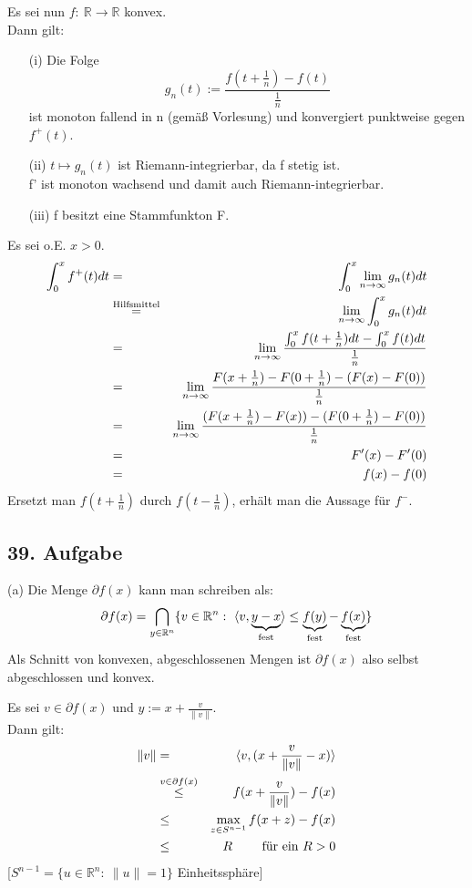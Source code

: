 \documentclass[a4paper,11pt,twoside,titlepage]{article}
\newcommand{\R}{{\mathbb R}}
\begin{document}
Es sei nun $f:\ \R\to\R$ konvex.\\
Dann gilt:
\begin{itemize}
\item[(i)] Die Folge \[g_n(t):=\frac{f(t+\frac 1n)-f(t)}{\frac 1n}\]
ist monoton fallend in n (gemäß Vorlesung) und konvergiert punktweise gegen $f^+(t)$.
\item[(ii)] $t\mapsto g_n(t)$ ist Riemann-integrierbar, da f stetig ist.\\
f' ist monoton wachsend und damit auch Riemann-integrierbar.
\item[(iii)] f besitzt eine Stammfunkton F.
\end{itemize}
Es sei o.E. $x>0$.
\begin{eqnarray*}
\int_0^xf^+(t)dt&=&\int_0^x\lim_{n\to\infty}g_n(t)dt\\
&\stackrel{\textnormal{Hilfsmittel}}{=}&\lim_{n\to\infty}\int_0^xg_n(t)dt\\
&=&\lim_{n\to\infty}\frac{\int_0^xf(t+\frac 1n)dt-\int_0^xf(t)dt}{\frac 1n}\\
&=&\lim_{n\to\infty}\frac{F(x+\frac 1n)-F(0+\frac 1n)-(F(x)-F(0))}{\frac 1n}\\
&=&\lim_{n\to\infty}\frac{(F(x+\frac 1n)-F(x))-(F(0+\frac 1n)-F(0))}{\frac 1n}\\
&=&F'(x)-F'(0)\\
&=&f(x)-f(0)
\end{eqnarray*}
Ersetzt man $f(t+\frac 1n)$ durch $f(t-\frac 1n)$, erhält man die Aussage für $f^-$.


\subsection*{39. Aufgabe}
(a) Die Menge $\partial f(x)$ kann man schreiben als:
\[\partial f(x)=\bigcap_{y\in\R^n}\{v\in\R^n:\ \langle v,\underbrace{y-x}_{\textnormal{fest}}\rangle\leq\underbrace{f(y)}_{\textnormal{fest}}-\underbrace{f(x)}_{\textnormal{fest}}\}\]
Als Schnitt von konvexen, abgeschlossenen Mengen ist $\partial f(x)$ also selbst abgeschlossen und konvex.

Es sei $v\in\partial f(x)$ und $y:=x+\frac{v}{\|v\|}$.\\
Dann gilt:
\begin{eqnarray*}
\|v\|&=&\langle v,(x+\frac{v}{\|v\|}-x)\rangle\\
&\stackrel{v\in\partial f(x)}{\leq}&f(x+\frac{v}{\|v\|})-f(x)\\
&\leq&\max_{z\in S^{n-1}}f(x+z)-f(x)\\
&\leq& R\qquad\textnormal{ für ein \ensuremath{R>0}}
\end{eqnarray*}
[$S^{n-1}=\{u\in\R^n:\ \|u\|=1\}$ Einheitssphäre]
\end{document}
